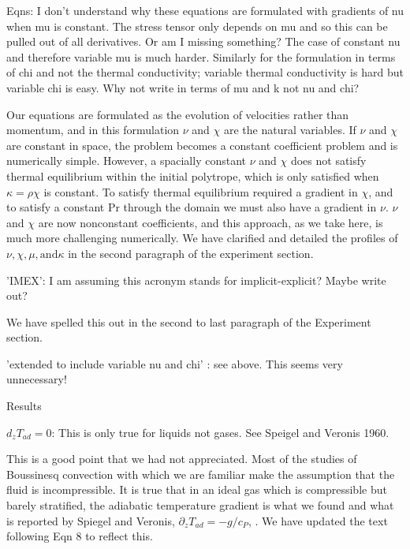 \documentclass[aps, 11pt, singlecolumn]{revtex4-1} %
\begin{document}
\begin{singlespace}
\begin{myquotation}
Eqns: I don't understand why these equations are formulated with
gradients of nu when mu is constant. The stress tensor only depends on
mu and so this can be pulled out of all derivatives. Or am I missing
something? The case of constant nu and therefore variable mu is much
harder. Similarly for the formulation in terms of chi and not the
thermal conductivity; variable thermal conductivity is hard but
variable chi is easy. Why not write in terms of mu and k not nu and
chi?
\end{myquotation}
Our equations are formulated as the evolution of velocities rather
than momentum, and in this formulation $\nu$ and $\chi$ are the
natural variables.  If $\nu$ and $\chi$ are constant in space,
the problem becomes a constant coefficient problem and is numerically
simple.  However, a spacially constant $\nu$ and $\chi$ does not satisfy
thermal equilibrium within the initial polytrope, which is only satisfied when
$\kappa = \rho\chi$ is constant.  To satisfy thermal equilibrium required
a gradient in $\chi$, and to satisfy a constant Pr through the domain we
must also have a gradient in $\nu$.  $\nu$ and $\chi$ are now nonconstant
coefficients, and this approach, as we take here, is much more challenging numerically. 
 We have
clarified and detailed the profiles of $\nu, \chi, \mu, \text{and} \kappa$
in the second paragraph of the experiment section.

\begin{myquotation}
'IMEX': I am assuming this acronym stands for implicit-explicit?
Maybe write out?
\end{myquotation}
We have spelled this out in the second to last paragraph of the Experiment section.

\begin{myquotation}
'extended to include variable nu and chi' : see above. This seems
very unnecessary!

Results

$d_z T_{ad} = 0$: This is only true for liquids not gases. See Speigel and
Veronis 1960.
\end{myquotation}
This is a good point that we had not appreciated.  Most of the studies of Boussinesq
convection with which we are familiar make the assumption that the fluid is incompressible.
It is true that in an ideal gas which is compressible but barely stratified, the
adiabatic temperature gradient is what we found and what is reported by
Spiegel and Veronis, $\partial_z T_{ad} = -g/c_P$, \cite{spiegel&veronis1960}.
We have updated the text following Eqn 8 to reflect this.


\end{singlespace}
\end{document}
